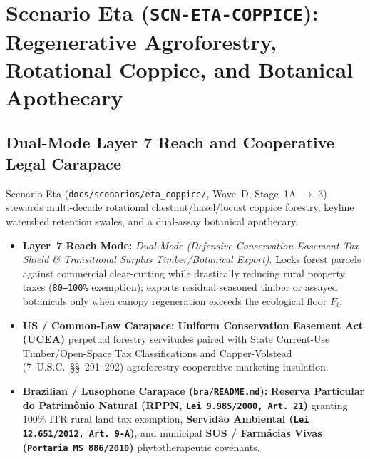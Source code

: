 \chapter{Scenario Eta (\texttt{SCN-ETA-COPPICE}): Regenerative Agroforestry, Rotational Coppice, and Botanical Apothecary}
\label{app:scenario-eta}

\section{Dual-Mode Layer 7 Reach and Cooperative Legal Carapace}
Scenario Eta (\texttt{docs/scenarios/eta\_coppice/}, Wave~D, Stage~1A $\to$ 3) stewards multi-decade rotational chestnut/hazel/locust coppice forestry, keyline watershed retention swales, and a dual-assay botanical apothecary.
\begin{itemize}
    \item \textbf{Layer~7 Reach Mode:} \textit{Dual-Mode (Defensive Conservation Easement Tax Shield \& Transitional Surplus Timber/Botanical Export)}. Locks forest parcels against commercial clear-cutting while drastically reducing rural property taxes (\texttt{80--100\%} exemption); exports residual seasoned timber or assayed botanicals only when canopy regeneration exceeds the ecological floor $F_t$.
    \item \textbf{US / Common-Law Carapace:} \textbf{Uniform Conservation Easement Act (UCEA)} perpetual forestry servitudes \parencite{ucea1981} paired with State Current-Use Timber/Open-Space Tax Classifications and Capper-Volstead (7~U.S.C.~\S\S~291--292) agroforestry cooperative marketing insulation.
    \item \textbf{Brazilian / Lusophone Carapace (\texttt{bra/README.md}):} \textbf{Reserva Particular do Patrim{\^o}nio Natural (RPPN, \texttt{Lei 9.985/2000, Art.~21})} granting $100\%$ ITR rural land tax exemption, \textbf{Servid{\~a}o Ambiental (\texttt{Lei 12.651/2012, Art.~9{\textordmasculine}-A})}, and municipal \textbf{SUS / Farm{\'a}cias Vivas (\texttt{Portaria MS 886/2010})} phytotherapeutic covenants.
\end{itemize}

